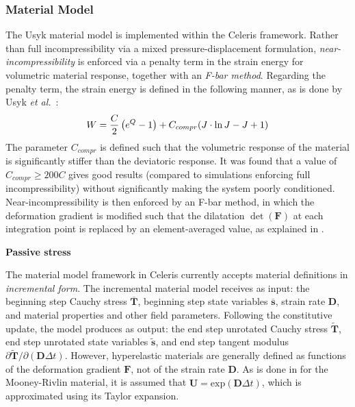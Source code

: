 \subsubsection{Material Model}
The Usyk material model is implemented within the Celeris framework. Rather than full incompressibility via a mixed pressure-displacement formulation, \textit{near-incompressibility} is enforced via a penalty term in the strain energy for volumetric material response, together with an \textit{F-bar method}. Regarding the penalty term, the strain energy is defined in the following manner, as is done by Usyk \textit{et al.}~\cite{usyk_2002}:
\begin{equation}
W = \frac{C}{2}\left(e^Q -1\right) + C_{compr} (J \cdot \ln J - J + 1) \\
\end{equation}
The parameter $C_{compr}$ is defined such that the volumetric response of the material is significantly stiffer than the deviatoric response. It was found that a value of $C_{compr} \geq 200  C$ gives good results (compared to simulations enforcing full incompressibility) without significantly making the system poorly conditioned. Near-incompressibility is then enforced by an F-bar method, in which the deformation gradient is modified such that the dilatation $\det(\bm{F})$ at each integration point is replaced by an element-averaged value, as explained in .

\textbf{Passive stress}

The material model framework in Celeris currently accepts material definitions in \textit{incremental form}. The incremental material model receives as input: the beginning step Cauchy stress $\overline{\bm{T}}$, beginning step state variables $\overline{\bm{s}}$, strain rate $\bm{D}$, and material properties and other field parameters. Following the constitutive update, the model produces as output: the end step unrotated Cauchy stress $\tilde{\bm{T}}$, end step unrotated state variables $\tilde{\bm{s}}$, and end step tangent modulus ${\partial \tilde{\bm{T}}}/{\partial (\bm{D}\Delta{t})}$. However, hyperelastic materials are generally defined as functions of the deformation gradient $\bm{F}$, not of the strain rate $\bm{D}$. As is done in  for the Mooney-Rivlin material, it is assumed that $\hat{\bm{U}} = \text{exp}(\bm{D}\Delta{t})$, which is approximated using its Taylor expansion.

